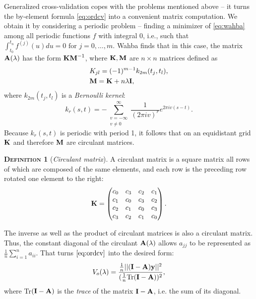 \documentclass[11pt,leqno]{book}
\theoremstyle{definition}
\theoremstyle{plain}
\theoremstyle{definition}
\newtheorem{definition}[theorem]{\scshape{Definition}}
\begin{document}
{Generalized cross-validation copes with the problems mentioned above --  it turns the by-element formula \eqref{eq:ordcv} into a convenient matrix computation. We obtain it by considering a periodic problem -- finding a minimizer of \eqref{eq:wahba} among all periodic functions $f$ with integral 0, i.e., such that $\int_{t_0}^{t_n}f^{(j)}(u)du=0\text{ for } j=0,\ldots,m$. Wahba \cite{Craven1978} finds that in this case, the matrix $\vb{A}(\lambda)$ has the form $\vb{KM}^{-1}$, where $\vb{K},\vb{M}$ are $n \times n$ matrices defined as
\begin{equation*}
\begin{aligned}
&{K}_{jl} = (-1)^{m-1} k_{2m}(t_j ,t_l),\\
&\vb{M}=\vb{K}+n\lambda \vb{I},
\end{aligned}
\end{equation*}
where $k_{2m}(t_j ,t_l)$ is a \textit{Bernoulli kernel}:
\[
k_r(s,t) = - \sum_{\substack{v=-\infty \\ v \ne 0}}^{\infty}\frac{1}{(2\pi i v)^r} e^{2\pi i v (s - t)}.
\]
Because $k_r(s,t)$ is periodic with period 1, it follows that on an equidistant grid $\vb{K}$ and therefore $\vb{M}$ are circulant matrices.
\begin{definition}[\textit{Circulant matrix}]
A circulant matrix is a square matrix all rows of which are composed of the same elements, and each row is the preceding row rotated one element to the right:
\[
\vb{K} =
\begin{pmatrix}
c_0 & c_3 & c_2 & c_1 \\
c_1 & c_0 & c_3 & c_2 \\
c_2 & c_1 & c_0 & c_3 \\
c_3 & c_2 & c_1 & c_0
\end{pmatrix}.
\]
\end{definition}
\noindent The inverse as well as the product of circulant matrices is also a circulant matrix. Thus, the constant diagonal of the circulant $\vb{A}(\lambda)$ allows $a_{jj}$ to be represented as $\frac{1}{n}\sum_{i=1}^na_{ii}$. That turns $\eqref{eq:ordcv}$ into the desired form:
\begin{equation}
V_o(\lambda) =\frac{\frac{1}{n}||(\vb{I}-\vb{A})\vb{y}||^2}{(\frac{1}{n}\text{Tr}(\vb{I}-\vb{A}))^2},
\label{eq:GCV}
\end{equation}
where Tr$(\vb{I}-\vb{A})$ is the \textit{trace} of the matrix $\vb{I}-\vb{A}$, i.e. the sum of its diagonal.

}
\end{document}
